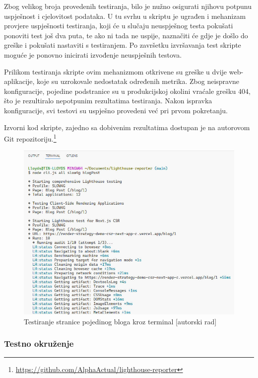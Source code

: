 \bigskip

Zbog velikog broja provedenih testiranja, bilo je nužno osigurati njihovu potpunu uspješnost i cjelovitost podataka. U tu svrhu u skriptu je ugrađen i mehanizam provjere uspješnosti testiranja, koji će u slučaju neuspješnog testa pokušati ponoviti test još dva puta, te ako ni tada ne uspije, naznačiti će gdje je došlo do greške i pokušati nastaviti s testiranjem. Po završetku izvršavanja test skripte moguće je ponovno inicirati izvođenje neuspješnih testova.

\bigskip

Prilikom testiranja skripte ovim mehanizmom otkrivene su greške u dvije web-aplikacije, koje su uzrokovale nedostatak određenih metrika. Zbog neispravne konfiguracije, pojedine podstranice su u produkcijskoj okolini vraćale grešku 404, što je rezultiralo nepotpunim rezultatima testiranja. Nakon ispravka konfiguracije, svi testovi su uspješno provedeni već pri prvom pokretanju.

\bigskip

Izvorni kod skripte, zajedno sa dobivenim rezultatima dostupan je na autorovom Git repozitoriju.\footnote{\url{https://github.com/AlphaActual/lighthouse-reporter}}

\begin{figure}[H]
    \centering
    \includegraphics[width=\textwidth]{slike/testiranje-aplikacije.jpg}
    \caption{Testiranje stranice pojedinog bloga kroz terminal [autorski rad]}
    \label{fig:testiranje-aplikacije}
\end{figure}

\subsubsection{Testno okruženje}

